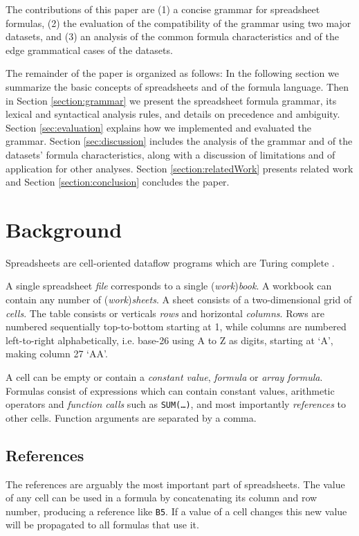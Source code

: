 \documentclass[conference]{IEEEtran}
\begin{document}
The contributions of this paper are (1) a concise grammar for spreadsheet formulas, (2) the evaluation of the compatibility of the grammar using two major datasets, and (3) an analysis of the common formula characteristics and of the edge grammatical cases of the datasets.

The remainder of the paper is organized as follows: In the following section we summarize the basic concepts of spreadsheets and of the formula language. Then in Section \ref{section:grammar} we present the spreadsheet formula grammar, its lexical and syntactical analysis rules, and details on precedence and ambiguity. Section \ref{sec:evaluation} explains how we implemented and evaluated the grammar. Section \ref{sec:discussion} includes the analysis of the grammar and of the datasets' formula characteristics, along with a discussion of limitations and of application for other analyses. Section \ref{section:relatedWork} presents related work and Section \ref{section:conclusion} concludes the paper.

\section{Background}

Spreadsheets are cell-oriented dataflow programs which are Turing complete \cite{ExcelTuringComplete}.

A single spreadsheet \emph{file} corresponds to a single (\emph{work})\emph{book}.
A workbook can contain any number of (\emph{work})\emph{sheets}.
A sheet consists of a two-dimensional grid of \emph{cells}.
The table consists or verticals \emph{rows} and horizontal \emph{columns}.
Rows are numbered sequentially top-to-bottom starting at 1, while columns are numbered left-to-right alphabetically, i.e. base-26 using A to Z as digits, starting at `A', making column 27 `AA'.

A cell can be empty or contain a \emph{constant value}, \emph{formula} or \emph{array formula}.
Formulas consist of expressions which can contain constant values, arithmetic operators and \emph{function calls} such as \texttt{SUM(\ldots)}, and most importantly \emph{references} to other cells.
Function arguments are separated by a comma.

\subsection{References}
The references are arguably the most important part of spreadsheets.
The value of any cell can be used in a formula by concatenating its column and row number, producing a reference like \texttt{B5}.
If a value of a cell changes this new value will be propagated to all formulas that use it.
\end{document}

